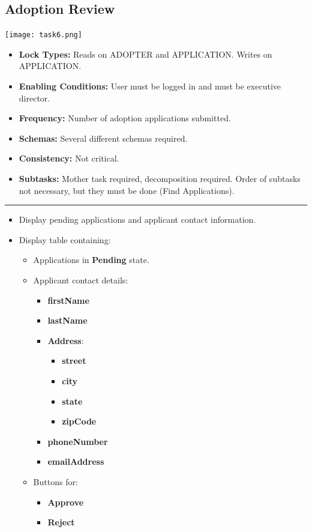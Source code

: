 \documentclass{article}
\begin{document}
\subsection{Adoption Review}
\begin{center}
    \texttt{[image: task6.png]}
\end{center}
\begin{itemize}
    \item \textbf{Lock Types:} Reads on ADOPTER and APPLICATION. Writes on APPLICATION.
    \item \textbf{Enabling Conditions:} User must be logged in and must be executive director.
    \item \textbf{Frequency:} Number of adoption applications submitted.
    \item \textbf{Schemas:} Several different schemas required.
    \item \textbf{Consistency:} Not critical.
    \item \textbf{Subtasks:} Mother task required, decomposition required. Order of subtasks not necessary, but they must be done (Find Applications).
\end{itemize}
\noindent\rule{8cm}{0.4pt}
\begin{itemize}
    \item Display pending applications and applicant contact information.
    \item Display table containing:
    \begin{itemize}
        \item Applications in \textbf{Pending} state.
        \item Applicant contact details:
        \begin{itemize}
            \item \textbf{firstName}
            \item \textbf{lastName}
            \item \textbf{Address}:
            \begin{itemize}
                \item \textbf{street}
                \item \textbf{city}
                \item \textbf{state}
                \item \textbf{zipCode}
            \end{itemize}
            \item \textbf{phoneNumber}
            \item \textbf{emailAddress}
        \end{itemize}
        \item Buttons for:
        \begin{itemize}
            \item \textbf{Approve}
            \item \textbf{Reject}
        \end{itemize}
    \end{itemize}
\end{itemize}
\end{document}
